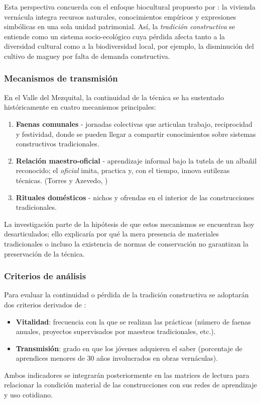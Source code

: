 Esta perspectiva concuerda con el enfoque biocultural propuesto por
\cite{chang2010patrimonio}: la vivienda
vernácula integra recursos naturales, conocimientos empíricos y
expresiones simbólicas en una sola unidad patrimonial.  Así, la
\emph{tradición constructiva} se entiende como un sistema
socio-ecológico cuya pérdida afecta tanto a la diversidad cultural como
a la biodiversidad local, por ejemplo, la disminución del cultivo de
maguey por falta de demanda constructiva.

\subsubsection{Mecanismos de transmisión}

En el Valle del Mezquital, la continuidad de la técnica se ha sustentado
históricamente en cuatro mecanismos principales:

\begin{enumerate}
	\item \textbf{Faenas comunales} - jornadas colectivas que
	      articulan trabajo, reciprocidad y festividad, donde se pueden llegar a
	      compartir conocimientos sobre sistemas constructivos tradicionales.
	\item \textbf{Relación maestro-oficial} - aprendizaje informal bajo la
	      tutela de un albañil reconocido; el
	      \emph{oficial} imita, practica y, con el tiempo, innova sutilezas
	      técnicas. (Torres y Azevedo, \citeyear{torres2021transmision})
	\item \textbf{Rituales domésticos} - nichos y ofrendas en el interior
	      de las construcciones tradicionales.
\end{enumerate}

La investigación parte de la hipótesis de que estos mecanismos se
encuentran hoy desarticulados; ello explicaría por qué la mera
presencia de materiales tradicionales o incluso la existencia de normas
de conservación no garantizan la preservación de la técnica.

\subsubsection{Criterios de análisis}

Para evaluar la continuidad o pérdida de la tradición constructiva
se adoptarán dos criterios derivados de \cite{UNESCO2005diversidad}:

\begin{itemize}
	\item \textbf{Vitalidad}: frecuencia con la que se realizan las
	      prácticas (número de faenas anuales, proyectos supervisados por
	      maestros tradicionales, etc.).
	\item \textbf{Transmisión}: grado en que los jóvenes adquieren el
	      saber (porcentaje de aprendices menores de 30 años involucrados
	      en obras vernáculas).
\end{itemize}

Ambos indicadores se integrarán posteriormente en las matrices de lectura
para relacionar la condición material de las construcciones con sus redes
de aprendizaje y uso cotidiano.
